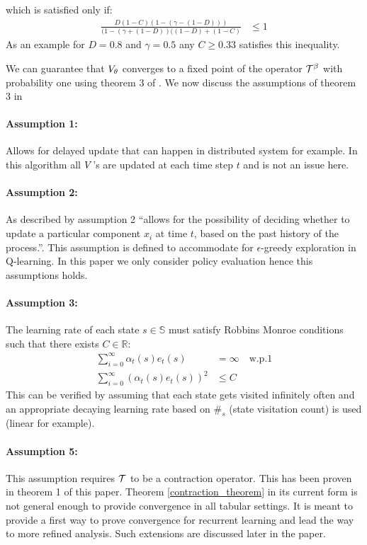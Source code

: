 which is satisfied only if:
\begin{equation}
\begin{split}
    \frac{D(1-C)(1-(\gamma-(1-D)))}{(1-(\gamma + (1-D))((1-D)+(1-C)} &\leq 1
\end{split}
\end{equation}
As an example for $D = 0.8$ and $\gamma = 0.5$ any $C\geq 0.33$ satisfies this inequality.

We can guarantee that $V_{\theta}$ converges to a fixed point of the operator $\mathcal{T}^{\beta}$ with probability one using theorem 3 of \cite{tsitsiklis1994asynchronous}. 
We now discuss the assumptions of theorem 3 in \cite{tsitsiklis1994asynchronous} 
\paragraph{Assumption 1:} Allows for delayed update that can happen in distributed system for example. In this algorithm all $V$'s are updated at each time step $t$ and is not an issue here.
\paragraph{Assumption 2: } As described by \cite{tsitsiklis1994asynchronous} assumption 2 ``allows for the possibility of deciding whether to update a particular component $x_i$ at time $t$, based on the past history of the process.''. This assumption is defined to accommodate for $\epsilon$-greedy exploration in Q-learning. In this paper we only consider policy evaluation hence this assumptions holds.
\paragraph{ Assumption 3:} The learning rate of each state $s \in \mathbb{S}$ must satisfy Robbins Monroe conditions such that there exists $C \in \mathbb{R}$:
\begin{equation}
    \begin{split}
        \sum_{i=0}^{\infty} \alpha_t(s) 
e_t(s) &= \infty \quad \text{w.p.1}\\
        \sum_{i=0}^{\infty} (\alpha_t(s) e_t(s))^2 &\leq C      \end{split}
\end{equation}
This can be verified by assuming that each state gets visited infinitely often and an appropriate decaying learning rate based on $\#_s$ (state visitation count) is used (linear for example). 
\paragraph{Assumption 5:} This assumption requires $\mathcal{T}$ to be a contraction operator. This has been proven in theorem 1 of this paper.
Theorem \ref{contraction_theorem} in its current form is not general enough to provide convergence in all tabular settings. It is meant to provide a first way to prove convergence for recurrent learning and lead the way to more refined analysis. Such extensions are discussed later in the paper.

